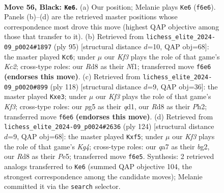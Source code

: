 \documentclass[11pt]{article}
\begin{document}
\clearpage

\begin{figure}[p]\centering
\begin{subfigure}{0.46\textwidth}\centering
\resizebox{\linewidth}{!}{%
\newchessgame
\chessboard[
  setfen={3r4/Q7/5k2/6P1/4P3/8/7P/1K6 b - - 0 56},
  showmover=false,
  pgfstyle=straightmove, color=movearrow, markmove={f6-e6}
]}
\caption{}
\end{subfigure}\hfill
\begin{subfigure}{0.46\textwidth}\centering
\resizebox{\linewidth}{!}{%
\newchessgame
\chessboard[
  setfen={8/2k5/PP6/8/8/8/8/2K2n2 b - - 0 48},
  showmover=false,
  pgfstyle=straightmove, color=movearrow, markmove={c7-c6}
]}
\caption{}
\end{subfigure}
\\[4pt]
\begin{subfigure}{0.46\textwidth}\centering
\resizebox{\linewidth}{!}{%
\newchessgame
\chessboard[
  setfen={6Q1/8/8/8/1k5p/4pK2/7P/3q4 w - - 0 60},
  showmover=false,
  pgfstyle=straightmove, color=movearrow, markmove={f3-e3}
]}
\caption{}
\end{subfigure}\hfill
\begin{subfigure}{0.46\textwidth}\centering
\resizebox{\linewidth}{!}{%
\newchessgame
\chessboard[
  setfen={8/8/8/2p1Pp2/6K1/k7/6b1/8 w - - 0 63},
  showmover=false,
  pgfstyle=straightmove, color=movearrow, markmove={g4-f5}
]}
\caption{}
\end{subfigure}
\caption{\textbf{Move 56, Black: \texttt{Ke6}.} (a) Our position; Melanie plays \texttt{Ke6} (\texttt{f6e6}). Panels (b)--(d) are the retrieved master positions whose correspondence most drove this move (highest QAP objective among those that transfer to it). (b) Retrieved from \texttt{lichess\_elite\_2024-09\_p0024\#1897} (ply 95) [structural distance $d$=10, QAP obj=68]: the master played \texttt{Kc6}; under $\mu$ our \emph{Kf3} plays the role of that game's \emph{Kc2}; cross-type roles: our \emph{R}d8 as their \emph{N}f1; transferred move \texttt{f6e6} \textbf{(endorses this move)}. (c) Retrieved from \texttt{lichess\_elite\_2024-09\_p0020\#899} (ply 118) [structural distance $d$=9, QAP obj=36]: the master played \texttt{Kxe3}; under $\mu$ our \emph{Kf3} plays the role of that game's \emph{Kf3}; cross-type roles: our \emph{p}g5 as their \emph{q}d1, our \emph{R}d8 as their \emph{P}h2; transferred move \texttt{f6e6} \textbf{(endorses this move)}. (d) Retrieved from \texttt{lichess\_elite\_2024-09\_p0024\#2636} (ply 124) [structural distance $d$=9, QAP obj=68]: the master played \texttt{Kxf5}; under $\mu$ our \emph{Kf3} plays the role of that game's \emph{Kg4}; cross-type roles: our \emph{q}a7 as their \emph{b}g2, our \emph{R}d8 as their \emph{P}e5; transferred move \texttt{f6e5}. Synthesis: 2 retrieved analogs transferred to \texttt{Ke6} (summed QAP objective 104, the strongest correspondence among the candidate moves); Melanie committed it via the \texttt{search} selector.}
\label{fig:thought-m111}
\end{figure}
\end{document}
